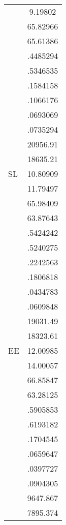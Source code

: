 {\begin{tabular}{l*{1}{c}}
                    &     9.19802\\
                    &    65.82966\\
                    &    65.61386\\
                    &    .4485294\\
                    &    .5346535\\
                    &    .1584158\\
                    &    .1066176\\
                    &    .0693069\\
                    &    .0735294\\
                    &    20956.91\\
                    &    18635.21\\
SL                  &    10.80909\\
                    &    11.79497\\
                    &    65.98409\\
                    &    63.87643\\
                    &    .5424242\\
                    &    .5240275\\
                    &    .2242563\\
                    &    .1806818\\
                    &    .0434783\\
                    &    .0609848\\
                    &    19031.49\\
                    &    18323.61\\
EE                  &    12.00985\\
                    &    14.00057\\
                    &    66.85847\\
                    &    63.28125\\
                    &    .5905853\\
                    &    .6193182\\
                    &    .1704545\\
                    &    .0659647\\
                    &    .0397727\\
                    &    .0904305\\
                    &    9647.867\\
                    &    7895.374\\

\end{tabular}}
